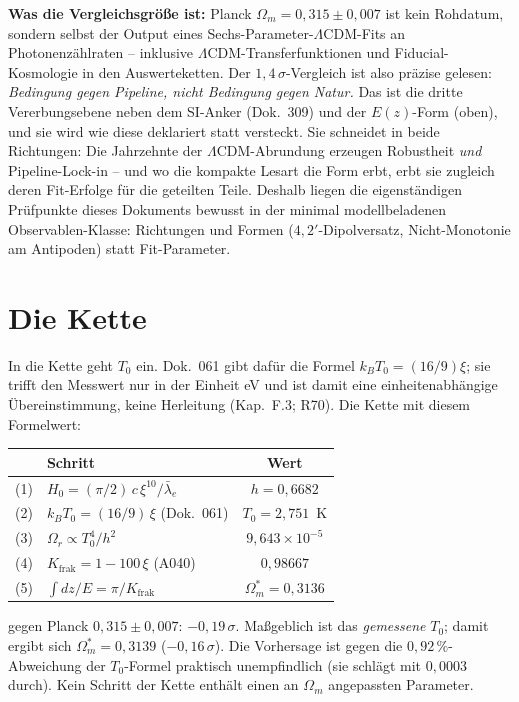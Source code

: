 \textbf{Was die Vergleichsgröße ist:} Planck
$\Omega_m = 0{,}315 \pm 0{,}007$ ist kein Rohdatum, sondern
selbst der Output eines Sechs-Parameter-$\Lambda$CDM-Fits an
Photonenzählraten -- inklusive $\Lambda$CDM-Transferfunktionen
und Fiducial-Kosmologie in den Auswerteketten. Der
$1{,}4\,\sigma$-Vergleich ist also präzise gelesen:
\emph{Bedingung gegen Pipeline, nicht Bedingung gegen Natur.}
Das ist die dritte Vererbungsebene neben dem SI-Anker (Dok.~309)
und der $E(z)$-Form (oben), und sie wird wie diese deklariert
statt versteckt. Sie schneidet in beide Richtungen: Die
Jahrzehnte der $\Lambda$CDM-Abrundung erzeugen Robustheit
\emph{und} Pipeline-Lock-in -- und wo die kompakte Lesart die
Form erbt, erbt sie zugleich deren Fit-Erfolge für die geteilten
Teile. Deshalb liegen die eigenständigen Prüfpunkte dieses
Dokuments bewusst in der minimal modellbeladenen
Observablen-Klasse: Richtungen und Formen
($4{,}2'$-Dipolversatz, Nicht-Monotonie am Antipoden) statt
Fit-Parameter.

\section{Die Kette}

In die Kette geht $T_0$ ein. Dok.~061 gibt dafür die Formel
$k_BT_0 = (16/9)\xi$; sie trifft den Messwert nur in der Einheit
eV und ist damit eine einheitenabhängige Übereinstimmung, keine
Herleitung (Kap.~F.3; R70). Die Kette mit diesem Formelwert:

\begin{center}
\begin{tabular}{clc}
\toprule
 & Schritt & Wert \\
\midrule
(1) & $H_0 = (\pi/2)\,c\,\xi^{10}/\bar\lambda_e$ & $h = 0{,}6682$ \\
(2) & $k_BT_0 = (16/9)\,\xi$ (Dok.~061) & $T_0 = 2{,}751$~K \\
(3) & $\Omega_r \propto T_0^4/h^2$ & $9{,}643\times10^{-5}$ \\
(4) & $K_\text{frak} = 1-100\,\xi$ (A040) & $0{,}98667$ \\
(5) & $\int dz/E = \pi/K_\text{frak}$ &
  $\Omega_m^{*} = 0{,}3136$ \\
\bottomrule
\end{tabular}
\end{center}

\noindent gegen Planck $0{,}315 \pm 0{,}007$: $-0{,}19\,\sigma$.
Maßgeblich ist das \emph{gemessene} $T_0$; damit ergibt sich
$\Omega_m^{*} = 0{,}3139$ ($-0{,}16\,\sigma$). Die Vorhersage ist
gegen die $0{,}92\,\%$-Abweichung der $T_0$-Formel praktisch
unempfindlich (sie schlägt mit $0{,}0003$ durch). Kein Schritt der
Kette enthält einen an $\Omega_m$ angepassten Parameter.

